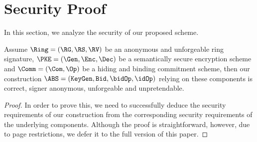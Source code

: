 \section{Security Proof}
\label{sec-secproof}

	In this section, we analyze the security of our proposed scheme.

	\begin{theorem}
	Assume $\Ring=(\RG, \RS, \RV)$ be an anonymous and unforgeable ring signature, $\PKE=(\Gen,\Enc, \Dec)$ be a semantically secure encryption scheme and $\Comm=(\Com, \Op)$ be a hiding and binding commitment scheme, then our construction $\ABS=(\mathtt{KeyGen},\mathtt{Bid},\bidOp,\idOp)$ relying on these components is correct, signer anonymous, unforgeable and unpretendable.
	\end{theorem}
	\begin{proof}
	In order to prove this, we need to successfully deduce the security requirements of our construction from the corresponding security requirements of the underlying components. Although the proof is straightforward, however, due to page restrictions, we defer it to the full version of this paper.
  

\end{proof}
